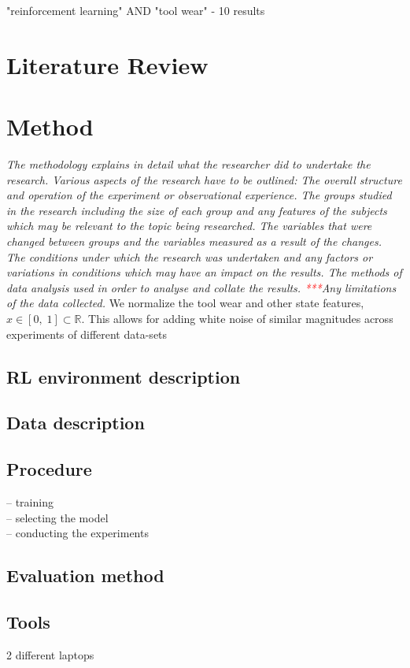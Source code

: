 \documentclass[a4paper, 12pt]{article}
\begin{document}
"reinforcement learning" AND "tool wear" - 10 results


\section{Literature Review}

\section{Method}

\textit{The methodology explains in detail what the researcher did to undertake the research. Various aspects of the research have to be outlined: The overall structure and operation of the experiment or observational experience. The groups studied in the research including the size of each group and any features of the subjects which may be relevant to the topic being researched. The variables that were changed between groups and the variables measured as a result of the changes. The conditions under which the research was undertaken and any factors or variations in conditions which may have an impact on the results. The methods of data analysis used in order to analyse and collate the results. \textcolor{red}{***}Any limitations of the data collected.}
We normalize the tool wear and other state features, $x \in [0,\;1] \subset \mathbb{R} $. This allows for adding white noise of similar magnitudes across experiments of different data-sets
\subsection{RL environment description}
\subsection{Data description}
\subsection{Procedure}
 -- training \\
 -- selecting the model\\
 -- conducting the experiments\\
 
\subsection{Evaluation method}
\subsection{Tools}
2 different laptops
\end{document}
